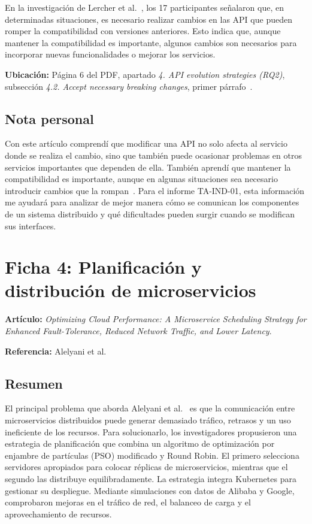 \documentclass[12pt,a4paper]{article}
\begin{document}
En la investigación de Lercher et al.~\cite{lercher2024}, los 17 participantes señalaron que, en determinadas situaciones, es necesario realizar cambios en las API que pueden romper la compatibilidad con versiones anteriores. Esto indica que, aunque mantener la compatibilidad es importante, algunos cambios son necesarios para incorporar nuevas funcionalidades o mejorar los servicios.

\textbf{Ubicación:} Página 6 del PDF, apartado \textit{4. API evolution strategies (RQ2)}, subsección \textit{4.2. Accept necessary breaking changes}, primer párrafo~\cite{lercher2024}.

\subsection*{Nota personal}

Con este artículo comprendí que modificar una API no solo afecta al servicio donde se realiza el cambio, sino que también puede ocasionar problemas en otros servicios importantes que dependen de ella. También aprendí que mantener la compatibilidad es importante, aunque en algunas situaciones sea necesario introducir cambios que la rompan~\cite{lercher2024}. Para el informe TA-IND-01, esta información me ayudará para analizar de mejor manera cómo se comunican los componentes de un sistema distribuido y qué dificultades pueden surgir cuando se modifican sus interfaces.

\section*{Ficha 4: Planificación y distribución de microservicios}

\noindent\textbf{Artículo:} \textit{Optimizing Cloud Performance: A Microservice Scheduling Strategy for Enhanced Fault-Tolerance, Reduced Network Traffic, and Lower Latency}.

\noindent\textbf{Referencia:} Alelyani et al.~\cite{alelyani2024}

\subsection*{Resumen}

El principal problema que aborda Alelyani et al.~\cite{alelyani2024} es que la comunicación entre microservicios distribuidos puede generar demasiado tráfico, retrasos y un uso ineficiente de los recursos. Para solucionarlo, los investigadores propusieron una estrategia de planificación que combina un algoritmo de optimización por enjambre de partículas (PSO) modificado y Round Robin. El primero selecciona servidores apropiados para colocar réplicas de microservicios, mientras que el segundo las distribuye equilibradamente. La estrategia integra Kubernetes para gestionar su despliegue. Mediante simulaciones con datos de Alibaba y Google, comprobaron mejoras en el tráfico de red, el balanceo de carga y el aprovechamiento de recursos.
\end{document}
